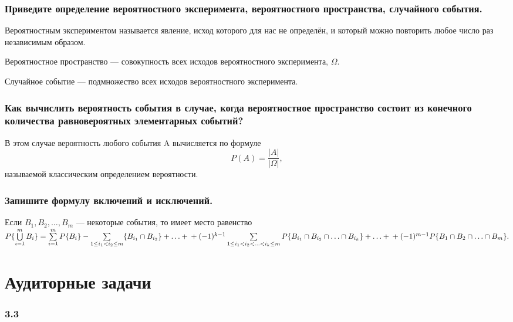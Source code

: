 \documentclass{book}
\begin{document}
\subsubsection*{Приведите определение вероятностного эксперимента, вероятностного пространства, случайного события.}

Вероятностным экспериментом называется явление, исход которого для нас не определён, и который можно повторить любое число раз независимым образом.

Вероятностное пространство --- совокупность всех исходов вероятностного эксперимента, $\Omega$.

Случайное событие --- подмножество всех исходов вероятностного эксперимента.

\subsubsection*{Как вычислить вероятность события в случае, когда вероятностное пространство состоит из конечного количества равновероятных элементарных событий?}

В этом случае вероятность любого события A вычисляется по формуле
$$ P(A) =
\frac{ |A| }{ |\Omega| },$$
называемой классическим определением вероятности.

\subsubsection*{Запишите формулу включений и исключений.}

Если
$ B_1, B_2,  \dotsc , B_m $ --- некоторые события, то имеет место равенство
$ P\{ \bigcup \limits_{i=1}^m B_i \} =
\sum \limits_{i=1}^m P \{ B_i \} -
\sum \limits_{ 1 \leq i_1 < i_2 \leq m } \{ B_{ i_1 } \cap B_{ i_2 } \} + \dotsc + \\
+ (-1)^{k-1} \sum \limits_{ 1 \leq i_1 < i_2 < \dotsc < i_k \leq m } P \{ B_{ i_1 } \cap B_{ i_2 } \cap \dotsc \cap B_{ i_k } \} + \dotsc + \\
+ (-1)^{m-1} P \{ B_1 \cap B_2 \cap \dotsc \cap B_m \}.$

\section*{Аудиторные задачи}

\subsubsection*{3.3}
\end{document}
